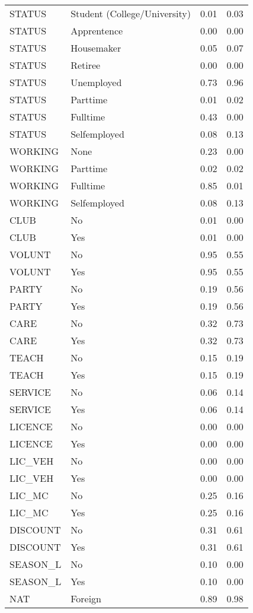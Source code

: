 \begin{longtable}{llrr}
  STATUS & Student (College/University) & 0.01 & 0.03 \\ 
  STATUS & Apprentence & 0.00 & 0.00 \\ 
  STATUS & Housemaker & 0.05 & 0.07 \\ 
  STATUS & Retiree & 0.00 & 0.00 \\ 
  STATUS & Unemployed & 0.73 & 0.96 \\ 
  STATUS & Parttime & 0.01 & 0.02 \\ 
  STATUS & Fulltime & 0.43 & 0.00 \\ 
  STATUS & Selfemployed & 0.08 & 0.13 \\ 
  WORKING & None & 0.23 & 0.00 \\ 
  WORKING & Parttime & 0.02 & 0.02 \\ 
  WORKING & Fulltime & 0.85 & 0.01 \\ 
  WORKING & Selfemployed & 0.08 & 0.13 \\ 
  CLUB & No & 0.01 & 0.00 \\ 
  CLUB & Yes & 0.01 & 0.00 \\ 
  VOLUNT & No & 0.95 & 0.55 \\ 
  VOLUNT & Yes & 0.95 & 0.55 \\ 
  PARTY & No & 0.19 & 0.56 \\ 
  PARTY & Yes & 0.19 & 0.56 \\ 
  CARE & No & 0.32 & 0.73 \\ 
  CARE & Yes & 0.32 & 0.73 \\ 
  TEACH & No & 0.15 & 0.19 \\ 
  TEACH & Yes & 0.15 & 0.19 \\ 
  SERVICE & No & 0.06 & 0.14 \\ 
  SERVICE & Yes & 0.06 & 0.14 \\ 
  LICENCE & No & 0.00 & 0.00 \\ 
  LICENCE & Yes & 0.00 & 0.00 \\ 
  LIC\_VEH & No & 0.00 & 0.00 \\ 
  LIC\_VEH & Yes & 0.00 & 0.00 \\ 
  LIC\_MC & No & 0.25 & 0.16 \\ 
  LIC\_MC & Yes & 0.25 & 0.16 \\ 
  DISCOUNT & No & 0.31 & 0.61 \\ 
  DISCOUNT & Yes & 0.31 & 0.61 \\ 
  SEASON\_L & No & 0.10 & 0.00 \\ 
  SEASON\_L & Yes & 0.10 & 0.00 \\ 
  NAT & Foreign & 0.89 & 0.98 \\ 

\end{longtable}
